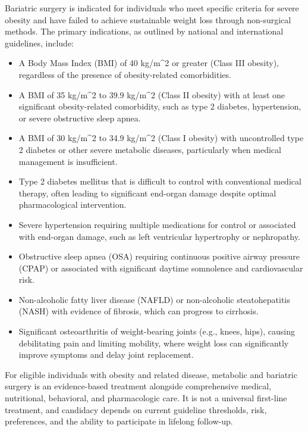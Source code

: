 Bariatric surgery is indicated for individuals who meet specific criteria for severe obesity and have failed to achieve sustainable weight loss through non-surgical methods. The primary indications, as outlined by national and international guidelines, include:

\begin{itemize}
  \item A Body Mass Index (BMI) of 40 kg/m\textasciicircum2 or greater (Class III obesity), regardless of the presence of obesity-related comorbidities.
  \item A BMI of 35 kg/m\textasciicircum2 to 39.9 kg/m\textasciicircum2 (Class II obesity) with at least one significant obesity-related comorbidity, such as type 2 diabetes, hypertension, or severe obstructive sleep apnea.
  \item A BMI of 30 kg/m\textasciicircum2 to 34.9 kg/m\textasciicircum2 (Class I obesity) with uncontrolled type 2 diabetes or other severe metabolic diseases, particularly when medical management is insufficient.
  \item Type 2 diabetes mellitus that is difficult to control with conventional medical therapy, often leading to significant end-organ damage despite optimal pharmacological intervention.
  \item Severe hypertension requiring multiple medications for control or associated with end-organ damage, such as left ventricular hypertrophy or nephropathy.
  \item Obstructive sleep apnea (OSA) requiring continuous positive airway pressure (CPAP) or associated with significant daytime somnolence and cardiovascular risk.
  \item Non-alcoholic fatty liver disease (NAFLD) or non-alcoholic steatohepatitis (NASH) with evidence of fibrosis, which can progress to cirrhosis.
  \item Significant osteoarthritis of weight-bearing joints (e.g., knees, hips), causing debilitating pain and limiting mobility, where weight loss can significantly improve symptoms and delay joint replacement.
\end{itemize}

For eligible individuals with obesity and related disease, metabolic and bariatric surgery is an evidence-based treatment alongside comprehensive medical, nutritional, behavioral, and pharmacologic care. It is not a universal first-line treatment, and candidacy depends on current guideline thresholds, risk, preferences, and the ability to participate in lifelong follow-up.

